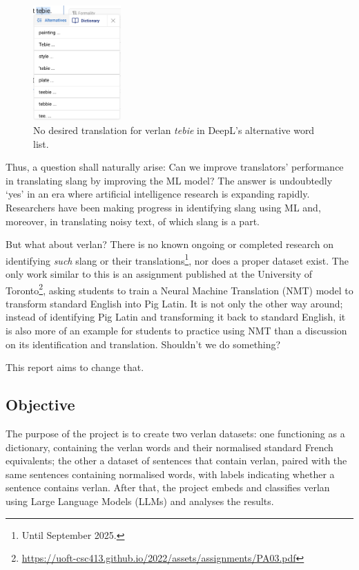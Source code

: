 \documentclass[12pt]{article}
\begin{document}
\begin{figure}[H]
\centering
\includegraphics[width=0.3\textwidth]{figures/deepl_alt_text.png}
\caption{\label{fig:deepl_alt_text}No desired translation for verlan \textit{tebie} in DeepL's alternative word list.}
\end{figure}

Thus, a question shall naturally arise: Can we improve translators' performance in translating slang by improving the ML model? The answer is undoubtedly `yes' in an era where artificial intelligence research is expanding rapidly. Researchers have been making progress in identifying slang using ML\cite{pei2019slang} and, moreover, in translating noisy text, of which slang is a part\cite{michel2018mtnt}. 

But what about verlan? There is no known ongoing or completed research on identifying \textit{such} slang or their translations\footnote{Until September 2025.}, nor does a proper dataset exist. The only work similar to this is an assignment published at the University of Toronto\footnote{\url{https://uoft-csc413.github.io/2022/assets/assignments/PA03.pdf}}, asking students to train a Neural Machine Translation (NMT) model to transform standard English into Pig Latin. It is not only the other way around; instead of identifying Pig Latin and transforming it back to standard English, it is also more of an example for students to practice using NMT than a discussion on its identification and translation. Shouldn't we do something?

This report aims to change that.

\subsection{Objective}

The purpose of the project is to create two verlan datasets: one functioning as a dictionary, containing the verlan words and their normalised standard French equivalents; the other a dataset of sentences that contain verlan, paired with the same sentences containing normalised words, with labels indicating whether a sentence contains verlan. After that, the project embeds and classifies verlan using Large Language Models (LLMs) and analyses the results.
\end{document}
